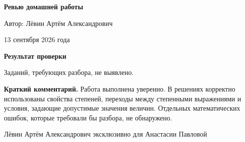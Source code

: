 \documentclass[12pt,a4paper]{article}
\begin{document}
\begin{titlepage}
\centering
\vspace*{0.24\textheight}

{\LARGE\bfseries Ревью домашней работы\par}
\vspace{18mm}
{\large Автор: Лёвин Артём Александрович\par}
\vspace{7mm}
{\large 13 сентября 2026 года\par}

\vfill
{}
\vspace*{8mm}
\end{titlepage}

\newpage
\thispagestyle{empty}
\vspace*{0.25\textheight}
\begin{center}
{\Large\bfseries Результат проверки\par}
\vspace{12mm}
{\large Заданий, требующих разбора, не выявлено.}
\end{center}

\vspace{14mm}
\textbf{Краткий комментарий.}
Работа выполнена уверенно. В решениях корректно использованы свойства степеней, переходы между степенными выражениями и условия, задающие допустимые значения величин. Отдельных математических ошибок, которые требовали бы разбора, не обнаружено.

\vfill
\begin{center}
\small Лёвин Артём Александрович эксклюзивно для Анастасии Павловой
\end{center}
\end{document}
